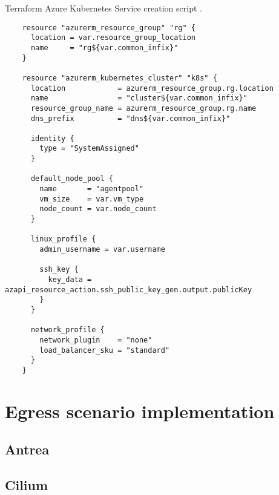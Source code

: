\begin{listing}[htb]
  \centering
  \caption{Terraform Azure Kubernetes Service creation script \cite{AKS}.}
  \begin{verbatim}
    resource "azurerm_resource_group" "rg" {
      location = var.resource_group_location
      name     = "rg${var.common_infix}"
    }

    resource "azurerm_kubernetes_cluster" "k8s" {
      location            = azurerm_resource_group.rg.location
      name                = "cluster${var.common_infix}"
      resource_group_name = azurerm_resource_group.rg.name
      dns_prefix          = "dns${var.common_infix}"

      identity {
        type = "SystemAssigned"
      }

      default_node_pool {
        name       = "agentpool"
        vm_size    = var.vm_type
        node_count = var.node_count
      }

      linux_profile {
        admin_username = var.username

        ssh_key {
          key_data = azapi_resource_action.ssh_public_key_gen.output.publicKey
        }
      }

      network_profile {
        network_plugin    = "none"
        load_balancer_sku = "standard"
      }
    }
  \end{verbatim}
  \label{lst:terraformScript}
\end{listing}




\section{Egress scenario implementation}
\label{sec:egressImpl}
\subsection{Antrea}
\label{sec:antreaEgress}

\subsection{Cilium}
\label{sec:ciliumEgress}


